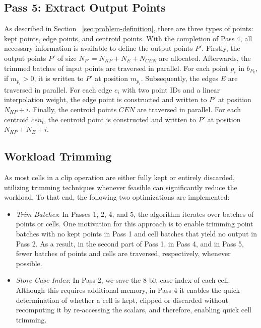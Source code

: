 \documentclass{egpubl}
\begin{document}
\subsection{Pass 5: Extract Output Points}

As described in Section ~\ref{sec:problem-definition}, there are three types of points: kept points, edge points, and centroid points. With the completion of Pass 4, all necessary information is available to define the output points $P'$. Firstly, the output points $P'$ of size $N_{P'} = N_{KP} + N_E + N_{CEN}$ are allocated. Afterwards, the trimmed batches of input points are traversed in parallel. For each point $p_i$ in $b_{P_k}$, if $m_{p_{i}} > 0$, it is written to $P'$ at position $m_{p_{i}}$. Subsequently, the edges $E$ are traversed in parallel. For each edge $e_i$ with two point IDs and a linear interpolation weight, the edge point is constructed and written to $P'$ at position $N_{KP} + i$. Finally, the centroid points $CEN$ are traversed in parallel. For each centroid $cen_i$, the centroid point is constructed and written to $P'$ at position $N_{KP} + N_E + i$.

\subsection{Workload Trimming}
\label{sec:workload-trimming}

As most cells in a clip operation are either fully kept or entirely discarded, utilizing trimming techniques whenever feasible can significantly reduce the workload. To that end, the following two optimizations are implemented:

\begin{itemize}
    \item \textit{Trim Batches}: In Passes 1, 2, 4, and 5, the algorithm iterates over batches of points or cells. One motivation for this approach is to enable trimming point batches with no kept points in Pass 1 and cell batches that yield no output in Pass 2. As a result, in the second part of Pass 1, in Pass 4, and in Pass 5, fewer batches of points and cells are traversed, respectively, whenever possible.
    \item \textit{Store Case Index}: In Pass 2, we save the 8-bit case index of each cell. Although this requires additional memory, in Pass 4 it enables the quick determination of whether a cell is kept, clipped or discarded without recomputing it by re-accessing the scalars, and therefore, enabling quick cell trimming.
\end{itemize}
\end{document}
